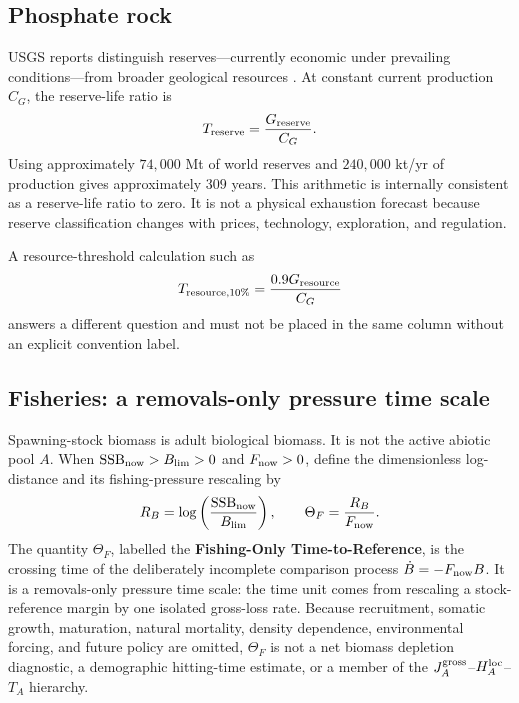 \documentclass[11pt]{article}
\begin{document}
\subsection{Phosphate rock}

USGS reports distinguish reserves---currently economic under prevailing conditions---from broader geological resources \cite{usgsmcs}. At constant current production $C_G$, the reserve-life ratio is
\begin{equation}
T_{\rm reserve}=\frac{G_{\rm reserve}}{C_G}.
\end{equation}
Using approximately $74{,}000$ Mt of world reserves and $240{,}000$ kt/yr of production gives approximately $309$ years. This arithmetic is internally consistent as a reserve-life ratio to zero. It is not a physical exhaustion forecast because reserve classification changes with prices, technology, exploration, and regulation.

A resource-threshold calculation such as
\[
T_{\rm resource,10\%}
=\frac{0.9G_{\rm resource}}{C_G}
\]
answers a different question and must not be placed in the same column without an explicit convention label.

\subsection{Fisheries: a removals-only pressure time scale}

Spawning-stock biomass is adult biological biomass. It is not the active abiotic pool $A$. When $\mathrm{SSB}_{\rm now}>B_{\lim}>0$ and $F_{\rm now}>0$, define the dimensionless log-distance and its fishing-pressure rescaling by
\begin{equation}
R_B=\log\left(\frac{\mathrm{SSB}_{\rm now}}{B_{\lim}}\right),
\qquad
\Theta_F=\frac{R_B}{F_{\rm now}}.
\label{eq:fishing-only}
\end{equation}
The quantity $\Theta_F$, labelled the \textbf{Fishing-Only Time-to-Reference}, is the crossing time of the deliberately incomplete comparison process $\dot B=-F_{\rm now}B$. It is a removals-only pressure time scale: the time unit comes from rescaling a stock-reference margin by one isolated gross-loss rate. Because recruitment, somatic growth, maturation, natural mortality, density dependence, environmental forcing, and future policy are omitted, $\Theta_F$ is not a net biomass depletion diagnostic, a demographic hitting-time estimate, or a member of the $J_A^{\rm gross}$--$H_A^{\rm loc}$--$T_A$ hierarchy.
\end{document}
